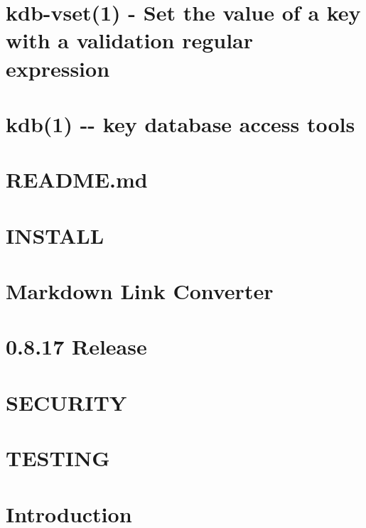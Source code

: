 \documentclass[twoside]{book}
\newcommand{\+}{\discretionary{\mbox{\scriptsize$\hookleftarrow$}}{}{}}
\begin{document}
\chapter{kdb-\/vset(1) -\/ Set the value of a key with a validation regular expression}
\label{md_doc_help_kdb-vset}
\hypertarget{md_doc_help_kdb-vset}{}

\chapter{kdb(1) -\/-\/ key database access tools}
\label{md_doc_help_kdb}
\hypertarget{md_doc_help_kdb}{}

\chapter{R\+E\+A\+D\+M\+E.\+md}
\label{doc_images_README_md}
\hypertarget{doc_images_README_md}{}

\chapter{I\+N\+S\+T\+A\+L\+L}
\label{doc_INSTALL_md}
\hypertarget{doc_INSTALL_md}{}

\chapter{Markdown Link Converter}
\label{doc_markdownlinkconverter_README_md}
\hypertarget{doc_markdownlinkconverter_README_md}{}

\chapter{0.8.17 Release}
\label{doc_NEWS_md}
\hypertarget{doc_NEWS_md}{}

\chapter{S\+E\+C\+U\+R\+I\+T\+Y}
\label{doc_SECURITY_md}
\hypertarget{doc_SECURITY_md}{}

\chapter{T\+E\+S\+T\+I\+N\+G}
\label{doc_TESTING_md}
\hypertarget{doc_TESTING_md}{}

\chapter{Introduction}
\label{doc_tutorials_application-integration_md}
\hypertarget{doc_tutorials_application-integration_md}{}

\end{document}
